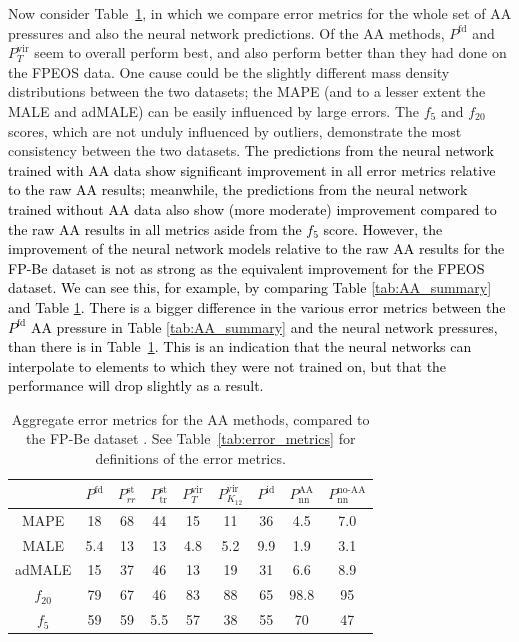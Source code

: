 \documentclass[%
 preprint,
 superscriptaddress,
 amsmath,amssymb,
longbibliography,
]{revtex4-2}
\newcommand{\change}[1]{\textcolor{black}{#1}}
\newcommand{\Pfd}{P^\textrm{fd}}
\newcommand{\Pstrr}{P^\textrm{st}_{rr}}
\newcommand{\Psttr}{P^\textrm{st}_\textrm{tr}}
\newcommand{\Pvirt}{P^\textrm{vir}_T}
\newcommand{\Pvirk}{P^\textrm{vir}_{K_{12}}}
\newcommand{\Pid}{P^\textrm{id}}
\newcommand{\Paa}{P_\textrm{nn}^\textrm{AA}}
\newcommand{\Pnaa}{P_\textrm{nn}^\textrm{no-AA}}
\begin{document}
Now consider Table~\ref{tab:AA_Be_summary}, in which we compare error metrics for the whole set of AA pressures and also the neural network predictions. Of the AA methods, $\Pfd$ and $\Pvirt$ seem to overall perform best, and also perform better than they had done on the FPEOS data. One cause could be the slightly different mass density distributions between the two datasets; the MAPE (and to a lesser extent the MALE and adMALE) can be easily influenced by large errors. The $f_5$ and $f_{20}$ scores, which are not unduly influenced by outliers, demonstrate the most consistency between the two datasets. \change{The predictions from the neural network trained with AA data show significant improvement in all error metrics relative to the raw AA results; meanwhile, the predictions from the neural network trained without AA data also show (more moderate) improvement compared to the raw AA results in all metrics aside from the $f_5$ score.}
\change{However, the improvement of the neural network models relative to the raw AA results for the FP-Be dataset is not as strong as the equivalent improvement for the FPEOS dataset. We can see this, for example, by comparing Table \ref{tab:AA_summary} and Table \ref{tab:AA_Be_summary}. There is a bigger difference in the various error metrics between the $\Pfd$ AA pressure in Table \ref{tab:AA_summary} and the neural network pressures, than there is in Table~\ref{tab:AA_Be_summary}. This is
an indication that the neural networks can interpolate to elements to which they were not
trained on, but that the performance will drop slightly as a result.} 




\begin{table}[]
    \centering
    \begin{tabular}{ccccccccc}
        \toprule
         & $\Pfd$ & $\Pstrr$ & $\Psttr$ & $\Pvirt$ & $\Pvirk$ & $\Pid$ & $\Paa$ & $\Pnaa$ \\ \midrule
        MAPE & 18 & 68 & 44 & 15 & 11 & 36  & 4.5 & 7.0\\
        MALE & 5.4 & 13 & 13 & 4.8 & 5.2 & 9.9 & 1.9 & 3.1 \\
        adMALE & 15 & 37 & 46 & 13 & 19 & 31 & 6.6 & 8.9 \\
        $f_{20}$ & 79 & 67 & 46 & 83 & 88 & 65 & 98.8 & 95 \\
        $f_{5}$ & 59 & 59 & 5.5 & 57 & 38 & 55 & 70 & 47\\
        \bottomrule
    \end{tabular}
    \caption{Aggregate error metrics for the AA methods, compared to the FP-Be dataset \cite{Hu_Be_EOS}. See Table~\ref{tab:error_metrics} for definitions of the error metrics.}
    \label{tab:AA_Be_summary}
\end{table}
\end{document}
